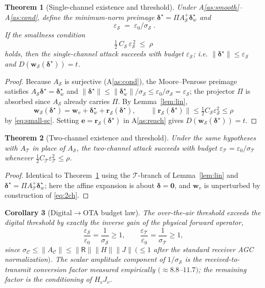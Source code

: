 \documentclass[11pt]{article}
\newtheorem{theorem}{Theorem}
\newtheorem{corollary}[theorem]{Corollary}
\theoremstyle{definition}
\newcommand{\norm}[1]{\lVert #1 \rVert}
\newcommand{\Rx}{\mathsf{R}}
\newcommand{\bw}{\bm{w}}
\newcommand{\bd}{\bm{\delta}}
\begin{document}
\begin{theorem}[Single-channel existence and threshold]\label{thm:sc}
Under A\ref{as:smooth}--A\ref{as:cond}, define the minimum-norm preimage
$\bd^\star=\Pi A_{\mathcal S}^{+}\bd_w^\star$ and
\[
  \boxed{\;\varepsilon_{\mathcal S} \;=\; \varepsilon_0/\sigma_{\mathcal S}\;}.
\]
If the smallness condition
\begin{equation}\label{eq:small-sc}
  \tfrac12\,C_{\mathcal S}\,\varepsilon_{\mathcal S}^{\,2}\;\le\;\rho
\end{equation}
holds, then the single-channel attack succeeds with budget $\varepsilon_{\mathcal S}$; i.e.
$\norm{\bd^\star}\le\varepsilon_{\mathcal S}$ and $D(\bw_{\mathcal S}(\bd^\star))=t$.
\end{theorem}

\begin{proof}
Because $A_{\mathcal S}$ is surjective (A\ref{as:cond}), the Moore--Penrose preimage satisfies
$A_{\mathcal S}\bd^\star=\bd_w^\star$ and
$\norm{\bd^\star}\le\norm{\bd_w^\star}/\sigma_{\mathcal S}\le\varepsilon_0/\sigma_{\mathcal S}
=\varepsilon_{\mathcal S}$; the projector $\Pi$ is absorbed since $A_{\mathcal S}$ already
carries $\Pi$. By Lemma~\ref{lem:lin},
\[
  \bw_{\mathcal S}(\bd^\star)=\bw_v+\bd_w^\star+\bm r_{\mathcal S}(\bd^\star),
  \qquad
  \norm{\bm r_{\mathcal S}(\bd^\star)}\le\tfrac12 C_{\mathcal S}\varepsilon_{\mathcal S}^2\le\rho
\]
by \eqref{eq:small-sc}. Setting $\bm e=\bm r_{\mathcal S}(\bd^\star)$ in A\ref{as:reach} gives
$D(\bw_{\mathcal S}(\bd^\star))=t$.
\end{proof}

\begin{theorem}[Two-channel existence and threshold]\label{thm:2ch}
Under the same hypotheses with $A_{\mathcal T}$ in place of $A_{\mathcal S}$, the two-channel
attack succeeds with budget
$\varepsilon_{\mathcal T}=\varepsilon_0/\sigma_{\mathcal T}$ whenever
$\tfrac12 C_{\mathcal T}\varepsilon_{\mathcal T}^2\le\rho$.
\end{theorem}

\begin{proof}
Identical to Theorem~\ref{thm:sc} using the $\mathcal T$-branch of Lemma~\ref{lem:lin} and
$\bd^\star=\Pi A_{\mathcal T}^{+}\bd_w^\star$; here the affine expansion is about $\bd=\bm0$,
and $\bw_v$ is unperturbed by construction of \eqref{eq:2ch}.
\end{proof}

\begin{corollary}[Digital$\to$OTA budget law]\label{cor:gap}
The over-the-air threshold exceeds the digital threshold by exactly the inverse gain of the
physical forward operator,
\[
  \frac{\varepsilon_{\mathcal S}}{\varepsilon_0}=\frac{1}{\sigma_{\mathcal S}}\ge 1,
  \qquad
  \frac{\varepsilon_{\mathcal T}}{\varepsilon_0}=\frac{1}{\sigma_{\mathcal T}}\ge 1,
\]
since $\sigma_{\mathcal C}\le\norm{A_{\mathcal C}}\le\norm{\Rx}\norm{H}\norm{J}\ (\le 1$ after
the standard receiver AGC normalization$)$. The scalar amplitude component of
$1/\sigma_{\mathcal S}$ is the received-to-transmit conversion factor measured empirically
$(\approx 8.8$--$11.7)$; the remaining factor is the conditioning of $H_vJ_v$.
\end{corollary}
\end{document}
